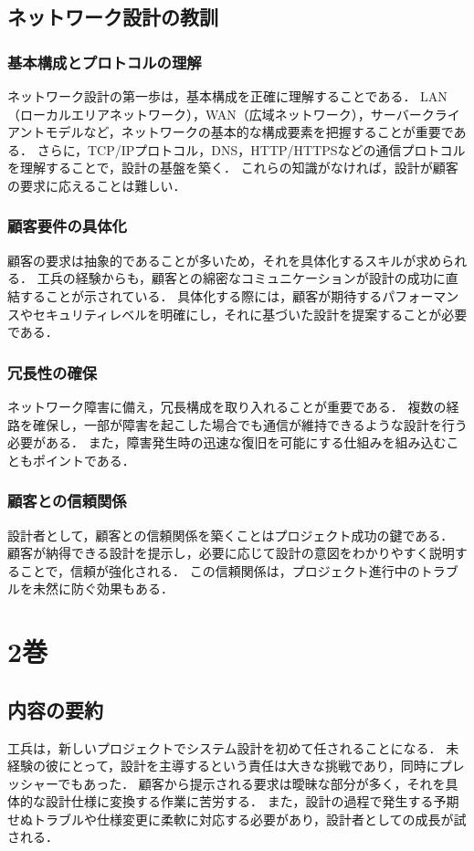 \documentclass[titlepage,a4paper]{jsarticle}
\begin{document}
\subsection{ネットワーク設計の教訓}
\subsubsection{基本構成とプロトコルの理解}
ネットワーク設計の第一歩は，基本構成を正確に理解することである．
LAN（ローカルエリアネットワーク），WAN（広域ネットワーク），サーバークライアントモデルなど，ネットワークの基本的な構成要素を把握することが重要である．
さらに，TCP/IPプロトコル，DNS，HTTP/HTTPSなどの通信プロトコルを理解することで，設計の基盤を築く．
これらの知識がなければ，設計が顧客の要求に応えることは難しい．
\subsubsection{顧客要件の具体化}
顧客の要求は抽象的であることが多いため，それを具体化するスキルが求められる．
工兵の経験からも，顧客との綿密なコミュニケーションが設計の成功に直結することが示されている．
具体化する際には，顧客が期待するパフォーマンスやセキュリティレベルを明確にし，それに基づいた設計を提案することが必要である．
\subsubsection{冗長性の確保}
ネットワーク障害に備え，冗長構成を取り入れることが重要である．
複数の経路を確保し，一部が障害を起こした場合でも通信が維持できるような設計を行う必要がある．
また，障害発生時の迅速な復旧を可能にする仕組みを組み込むこともポイントである．

\subsubsection{顧客との信頼関係}
設計者として，顧客との信頼関係を築くことはプロジェクト成功の鍵である．
顧客が納得できる設計を提示し，必要に応じて設計の意図をわかりやすく説明することで，信頼が強化される．
この信頼関係は，プロジェクト進行中のトラブルを未然に防ぐ効果もある．
\newpage
\section{2巻}
\subsection{内容の要約}
工兵は，新しいプロジェクトでシステム設計を初めて任されることになる．
未経験の彼にとって，設計を主導するという責任は大きな挑戦であり，同時にプレッシャーでもあった．
顧客から提示される要求は曖昧な部分が多く，それを具体的な設計仕様に変換する作業に苦労する．
また，設計の過程で発生する予期せぬトラブルや仕様変更に柔軟に対応する必要があり，設計者としての成長が試される．
\end{document}
